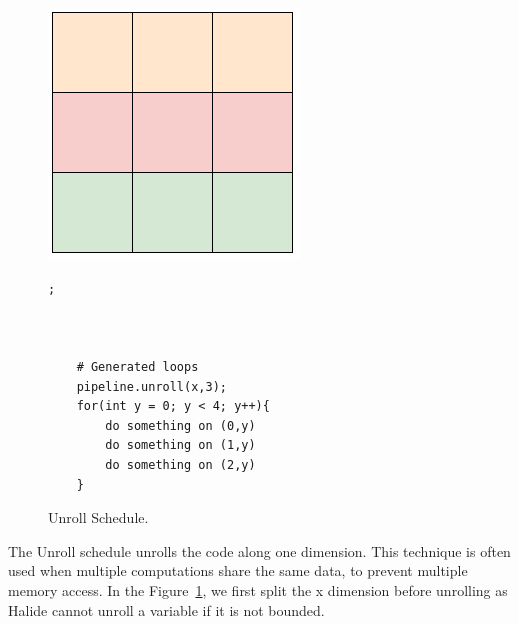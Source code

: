 \begin{figure}[H]
		\begin{minipage}[c]{\EIW}
			\centering
		\includegraphics[width=\textwidth]{Images/Unroll.png}
		\end{minipage}
		\begin{minipage}[c]{\ECW}
			\centering
			\begin{lstlisting}[label={code:reorder}];



	# Generated loops
	pipeline.unroll(x,3);
	for(int y = 0; y < 4; y++){
		do something on (0,y)
		do something on (1,y)
		do something on (2,y)
	}

\end{lstlisting}
		\end{minipage}
	\caption{Unroll Schedule.}
	\label{schedule:unroll}
\end{figure}
	The Unroll schedule unrolls the code along one dimension. This technique is often used when multiple computations share the same data, to prevent multiple memory access. In the Figure~\ref{schedule:unroll}, we first  split the x dimension before unrolling as Halide cannot unroll a variable if it is not bounded.

